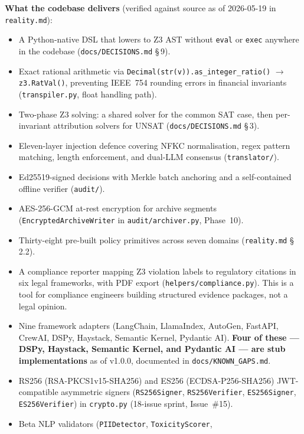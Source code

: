 \documentclass[12pt,a4paper,oneside]{report}
\newcommand{\fname}[1]{\texttt{#1}}          %
\newcommand{\code}[1]{\texttt{#1}}           %
\newcommand{\cfrsec}[1]{\S\,#1}             %
\begin{document}
\textbf{What the codebase delivers} (verified against source as of
2026-05-19 in \fname{reality.md}):
\begin{itemize}
  \item A Python-native DSL that lowers to Z3 AST without \code{eval} or
        \code{exec} anywhere in the codebase (\fname{docs/DECISIONS.md}
        \cfrsec{9}).
  \item Exact rational arithmetic via \code{Decimal(str(v)).as\_integer\_ratio()}
        $\to$ \code{z3.RatVal()}, preventing IEEE~754 rounding errors in
        financial invariants (\fname{transpiler.py}, float handling path).
  \item Two-phase Z3 solving: a shared solver for the common SAT case, then
        per-invariant attribution solvers for UNSAT (\fname{docs/DECISIONS.md}
        \cfrsec{3}).
  \item Eleven-layer injection defence covering NFKC normalisation, regex
        pattern matching, length enforcement, and dual-LLM consensus
        (\fname{translator/}).
  \item Ed25519-signed decisions with Merkle batch anchoring and a
        self-contained offline verifier (\fname{audit/}).
  \item AES-256-GCM at-rest encryption for archive segments
        (\code{EncryptedArchiveWriter} in \fname{audit/archiver.py},
        Phase~10).
  \item Thirty-eight pre-built policy primitives across seven domains
        (\fname{reality.md} \cfrsec{2.2}).
  \item A compliance reporter mapping Z3 violation labels to regulatory
        citations in six legal frameworks, with PDF export
        (\fname{helpers/compliance.py}).  This is a tool for compliance
        engineers building structured evidence packages, not a legal opinion.
  \item Nine framework adapters (LangChain, LlamaIndex, AutoGen, FastAPI,
        CrewAI, DSPy, Haystack, Semantic Kernel, Pydantic AI).
        \textbf{Four of these --- DSPy, Haystack, Semantic Kernel, and
        Pydantic AI --- are stub implementations} as of v1.0.0, documented
        in \fname{docs/KNOWN\_GAPS.md}.
  \item RS256 (RSA-PKCS1v15-SHA256) and ES256 (ECDSA-P256-SHA256) JWT-compatible
        asymmetric signers (\code{RS256Signer}, \code{RS256Verifier},
        \code{ES256Signer}, \code{ES256Verifier}) in \fname{crypto.py}
        (18-issue sprint, Issue~\#15).
  \item Beta NLP validators (\code{PIIDetector}, \code{ToxicityScorer},

\end{itemize}
\end{document}
